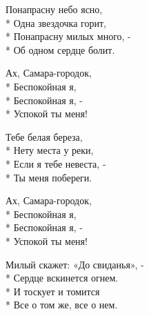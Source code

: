 \begin{minipage}{\linewidth}
Понапрасну небо ясно,\\*
Одна звездочка горит,\\*
Понапрасну милых много, - \\*
Об одном сердце болит.\\
\end{minipage}\par\medskip\nobreak

\medskip

\begin{minipage}{\linewidth}
\hspace*{1.5em}Ах, Самара-городок,\\*
\hspace*{1.5em}Беспокойная я,\\*
\hspace*{1.5em}Беспокойная я, - \\*
\hspace*{1.5em}Успокой ты меня!\\
\end{minipage}\par\medskip\nobreak

\medskip

\begin{minipage}{\linewidth}
Тебе белая береза,\\*
Нету места у реки,\\*
Если я тебе невеста, - \\*
Ты меня побереги.\\
\end{minipage}\par\medskip\nobreak

\medskip

\begin{minipage}{\linewidth}
\hspace*{1.5em}Ах, Самара-городок,\\*
\hspace*{1.5em}Беспокойная я,\\*
\hspace*{1.5em}Беспокойная я, - \\*
\hspace*{1.5em}Успокой ты меня!\\
\end{minipage}\par\medskip\nobreak

\medskip

\begin{minipage}{\linewidth}
Милый скажет: «До свиданья», - \\*
Сердце вскинется огнем.\\*
И тоскует и томится\\*
Все о том же, все о нем.\\
\end{minipage}\par\medskip\nobreak

